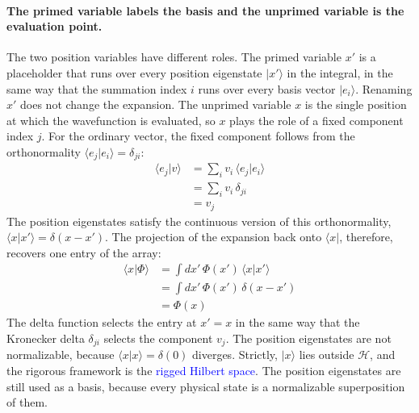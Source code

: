 \documentclass[11pt]{article}      %
\numberwithin{equation}{section}   %
\begin{document}
\paragraph{The primed variable labels the basis and the unprimed variable is the evaluation point.} The two position variables have different roles. The primed variable $x'$ is a placeholder that runs over every position eigenstate $|x'\rangle$ in the integral, in the same way that the summation index $i$ runs over every basis vector $|e_i\rangle$. Renaming $x'$ does not change the expansion. The unprimed variable $x$ is the single position at which the wavefunction is evaluated, so $x$ plays the role of a fixed component index $j$. For the ordinary vector, the fixed component follows from the orthonormality $\langle e_j | e_i \rangle = \delta_{ji}$:
\begin{align*}
    \langle e_j | v \rangle &= \sum_i v_i\, \langle e_j | e_i \rangle \\
    &= \sum_i v_i\, \delta_{ji} \\
    &= v_j
\end{align*}
The position eigenstates satisfy the continuous version of this orthonormality, $\langle x | x' \rangle = \delta(x - x')$. The projection of the expansion back onto $\langle x|$, therefore, recovers one entry of the array:
\begin{align*}
    \langle x | \Phi \rangle &= \int dx'\, \Phi(x')\, \langle x | x' \rangle \\
    &= \int dx'\, \Phi(x')\, \delta(x - x') \\
    &= \Phi(x)
\end{align*}
The delta function selects the entry at $x' = x$ in the same way that the Kronecker delta $\delta_{ji}$ selects the component $v_j$. The position eigenstates are not normalizable, because $\langle x | x \rangle = \delta(0)$ diverges. Strictly, $|x\rangle$ lies outside $\mathcal{H}$, and the rigorous framework is the \textcolor{blue}{rigged Hilbert space}. The position eigenstates are still used as a basis, because every physical state is a normalizable superposition of them.
\end{document}
